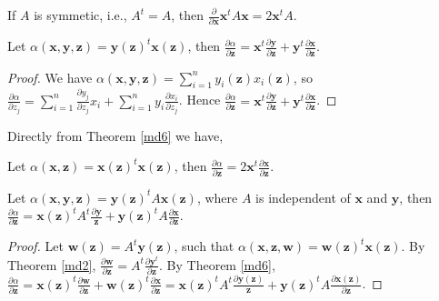 \begin{theorem} \label{md5}
If $A$ is symmetic, i.e., $A^t = A$, then $\frac{\partial}{\partial \bm{x}} \bm{x}^t A \bm{x} = 2 \bm{x}^t A$.
\end{theorem}


\begin{theorem} \label{md6}
Let $\alpha(\bm{x}, \bm{y}, \bm{z}) = \bm{y}(\bm{z})^t \bm{x}(\bm{z})$, then $\frac{\partial \alpha}{\partial \bm{z}} = \bm{x}^t \frac{\partial \bm{y}}{\partial \bm{z}} + \bm{y}^t \frac{\partial \bm{x}}{\partial \bm{z}}$.
\end{theorem}

\begin{proof}
We have $\alpha(\bm{x}, \bm{y}, \bm{z}) = \sum_{i = 1}^n y_i(\bm{z}) x_i(\bm{z})$, so $\frac{\partial \alpha}{\partial z_j} = \sum_{i = 1}^n \frac{\partial y_j}{\partial z_j} x_i + \sum_{i = 1}^n y_i \frac{\partial x_i}{\partial z_j}$.
Hence $\frac{\partial \alpha}{\partial \bm{z}} = \bm{x}^t \frac{\partial \bm{y}}{\partial \bm{z}} + \bm{y}^t \frac{\partial \bm{x}}{\partial \bm{z}}$.
\end{proof}


Directly from Theorem \ref{md6} we have,

\begin{theorem} \label{md7}
    Let $\alpha(\bm{x}, \bm{z}) = \bm{x}(\bm{z})^t \bm{x}(\bm{z})$, then $\frac{\partial \alpha}{\partial \bm{z}} = 2 \bm{x}^t \frac{\partial \bm{x}}{\partial \bm{z}}$.
\end{theorem}


\begin{theorem} \label{md8}
    Let $\alpha(\bm{x}, \bm{y}, \bm{z}) = \bm{y}(\bm{z})^t A \bm{x}(\bm{z})$, where $A$ is independent of $\bm{x}$ and $\bm{y}$, then $\frac{\partial \alpha}{\partial \bm{z}} = \bm{x}(\bm{z})^t A^t \frac{\partial \bm{y}}{\bm{z}} + \bm{y}(\bm{z})^t A \frac{\partial \bm{x}}{\partial \bm{z}}$.
\end{theorem}

\begin{proof}
    Let $\bm{w}(\bm{z}) = A^t \bm{y}(\bm{z})$, such that $\alpha(\bm{x}, \bm{z}, \bm{w}) = \bm{w}(\bm{z})^t \bm{x}(\bm{z})$.
    By Theorem \ref{md2}, $\frac{\partial \bm{w}}{\partial \bm{z}} = A^t \frac{\partial \bm{y}^t}{\partial \bm{z}}$.
    By Theorem \ref{md6}, $\frac{\partial \alpha}{\partial \bm{z}} = \bm{x}(\bm{z})^t \frac{\partial \bm{w}}{\partial \bm{z}} + \bm{w}(\bm{z})^t \frac{\partial \bm{x}}{\partial \bm{z}} = \bm{x}(\bm{z})^t A^t \frac{\partial \bm{y}(\bm{z})}{\bm{z}} + \bm{y}(\bm{z})^t A \frac{\partial \bm{x}(\bm{z})}{\partial \bm{z}}$.
\end{proof}


